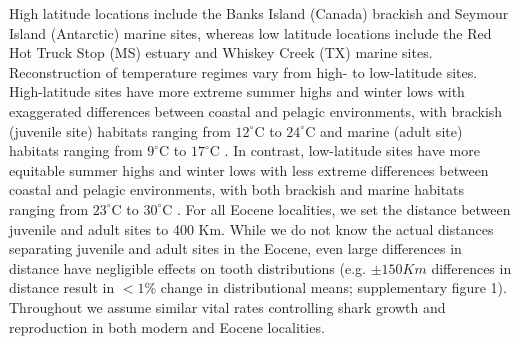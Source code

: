 \documentclass[]{rsos}%
\begin{document}
High latitude locations include the Banks Island (Canada) brackish and Seymour Island (Antarctic) marine sites, whereas low latitude locations include the Red Hot Truck Stop (MS) estuary and Whiskey Creek (TX) marine sites.
Reconstruction of temperature regimes vary from high- to low-latitude sites.
High-latitude sites have more extreme summer highs and winter lows with exaggerated differences between coastal and pelagic environments, with brackish (juvenile site) habitats ranging from $12^\circ$C to $24^\circ$C \cite{sluijs2008arctic, eberle2010seasonal, west2015arctic, west2020paleobotanical} and marine (adult site) habitats ranging from $9^\circ$C to $17^\circ$C \cite{zhu2020simulation, Kim2020, west2020paleobotanical, west2015arctic}.
In contrast, low-latitude sites have more equitable summer highs and winter lows with less extreme differences between coastal and pelagic environments, with both brackish and marine habitats ranging from $23^\circ$C to $30^\circ$C \cite{keating2011warm, ivany2004intra}.
For all Eocene localities, we set the distance between juvenile and adult sites to 400 Km.
While we do not know the actual distances separating juvenile and adult sites in the Eocene, even large differences in distance have negligible effects on tooth distributions (e.g. $\pm 150 Km$ differences in distance result in $<1\%$ change in distributional means; supplementary figure 1).
Throughout we assume similar vital rates controlling shark growth and reproduction in both modern and Eocene localities.
\end{document}

